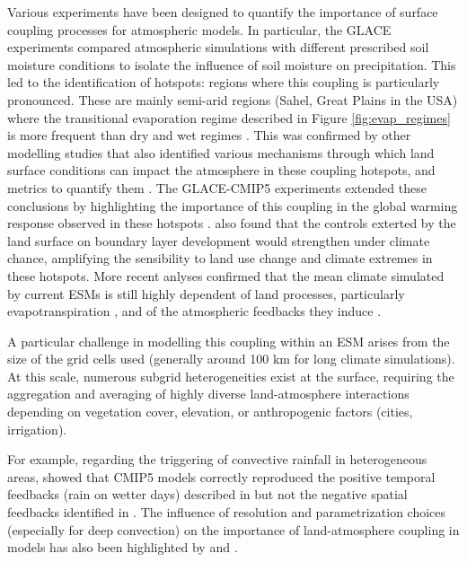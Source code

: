 Various experiments have been designed to quantify the importance of surface coupling processes for atmospheric models. In particular, the GLACE experiments \citep{koster_glace_2006} compared atmospheric simulations with different prescribed soil moisture conditions to isolate the influence of soil moisture on precipitation. This led to the identification of hotspots: regions where this coupling is particularly pronounced. These are mainly semi-arid regions (Sahel, Great Plains in the USA) where the transitional evaporation regime described in Figure \ref{fig:evap_regimes} is more frequent than dry and wet regimes \citep{koster_regions_2004}.
This was confirmed by other modelling studies that also identified various mechanisms through which land surface conditions can impact the atmosphere in these coupling hotspots, and metrics to quantify them \citep{dirmeyer_terrestrial_2011,santanello_landatmosphere_2018, zou_precipitation_2023}.
The GLACE-CMIP5 experiments \citep{seneviratne_impact_2013} extended these conclusions by highlighting the importance of this coupling in the global warming response observed in these hotspots \citep{berg_interannual_2015}.
\citet{dirmeyer_intensified_2014} also found that the controls exterted by the land surface on boundary layer development would strengthen under climate chance, amplifying the sensibility to land use change and climate extremes in these hotspots.
More recent anlyses confirmed that the mean climate simulated by current ESMs is still highly dependent of land processes, particularly evapotranspiration \citep{zarakas_land_2024}, and of the atmospheric feedbacks they induce \citep{lague_separating_2019}.

\hfill

A particular challenge in modelling this coupling within an ESM arises from the size of the grid cells used (generally around 100 km for long climate simulations). At this scale, numerous subgrid heterogeneities exist at the surface, requiring the aggregation and averaging of highly diverse land-atmosphere interactions depending on vegetation cover, elevation, or anthropogenic factors (cities, irrigation).

For example, regarding the triggering of convective rainfall in heterogeneous areas, \citet{moon_soil_2019} showed that CMIP5 models correctly reproduced the positive temporal feedbacks (rain on wetter days) described in \citet{guillod_reconciling_2015} but not the negative spatial feedbacks identified in \citet{taylor_afternoon_2012}. The influence of resolution and parametrization choices (especially for deep convection) on the importance of land-atmosphere coupling in models has also been highlighted by \citet{tuinenburg_high-resolution_2020} and \citet{lee_weaker_2024}.

